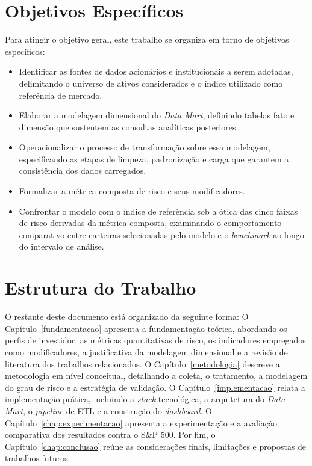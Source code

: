 \section{Objetivos Específicos}
\label{sec:objetivos-especificos}

Para atingir o objetivo geral, este trabalho se organiza em torno de objetivos específicos:

\begin{itemize}
    \item Identificar as fontes de dados acionários e institucionais a serem adotadas, delimitando o universo de ativos considerados e o índice utilizado como referência de mercado.
    \item Elaborar a modelagem dimensional do \textit{Data Mart}, definindo tabelas fato e dimensão que sustentem as consultas analíticas posteriores.
    \item Operacionalizar o processo de transformação sobre essa modelagem, especificando as etapas de limpeza, padronização e carga que garantem a consistência dos dados carregados.
    \item Formalizar a métrica composta de risco e seus modificadores.
    \item Confrontar o modelo com o índice de referência sob a ótica das cinco faixas de risco derivadas da métrica composta, examinando o comportamento comparativo entre carteiras selecionadas pelo modelo e o \textit{benchmark} ao longo do intervalo de análise.
\end{itemize}

\section{Estrutura do Trabalho}

O restante deste documento está organizado da seguinte forma: O Capítulo~\ref{fundamentacao} apresenta a fundamentação teórica, abordando os perfis de investidor, as métricas quantitativas de risco, os indicadores empregados como modificadores, a justificativa da modelagem dimensional e a revisão de literatura dos trabalhos relacionados. O Capítulo~\ref{metodologia} descreve a metodologia em nível conceitual, detalhando a coleta, o tratamento, a modelagem do grau de risco e a estratégia de validação. O Capítulo~\ref{implementacao} relata a implementação prática, incluindo a \textit{stack} tecnológica, a arquitetura do \textit{Data Mart}, o \textit{pipeline} de ETL e a construção do \textit{dashboard}. O Capítulo~\ref{chap:experimentacao} apresenta a experimentação e a avaliação comparativa dos resultados contra o S\&P 500. Por fim, o Capítulo~\ref{chap:conclusao} reúne as considerações finais, limitações e propostas de trabalhos futuros.

\bigskip

